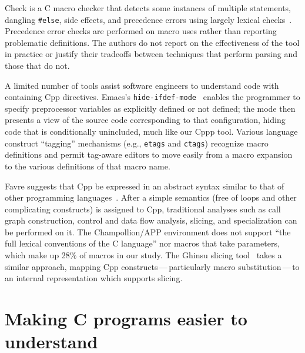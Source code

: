 \documentclass[10pt]{article}
\begin{document}

Check is a C macro checker that detects some instances of multiple
statements, dangling {\tt \#else}, side effects, and precedence errors
using largely lexical checks~\cite{SpulerS92}.  Precedence error checks are
performed on macro uses rather than reporting problematic definitions.  The
authors do not report on the effectiveness of the tool in practice or
justify their tradeoffs between techniques that perform parsing and those
that do not.

A limited number of tools assist software engineers to
understand code with containing Cpp directives.  Emacs's
\texttt{hide-ifdef-mode}~\cite{GNUEmacs19.26} enables the programmer to specify
preprocessor variables as explicitly defined or not defined; the mode then
presents a view of the source code corresponding to that configuration,
hiding code that is conditionally unincluded, much like our Cppp tool.
Various language construct ``tagging'' mechanisms (e.g., \texttt{etags} and
\texttt{ctags}) recognize macro definitions and permit tag-aware editors
to move easily from a macro expansion to the various definitions of that
macro name.

Favre suggests that Cpp be expressed in an abstract syntax similar to that of
other programming languages~\cite{Favre96}.  After a simple semantics (free
of loops and other complicating constructs) is assigned to Cpp, traditional
analyses such as call graph construction, control and data flow analysis,
slicing, and specialization can be performed on it.  The Champollion/APP
environment does not support ``the full lexical conventions of the C
language'' nor macros that take parameters, which make up 28\% of macros in
our study.
The Ghinsu slicing tool~\cite{LivadasS94} takes a similar approach, mapping
Cpp constructs\,---\,particularly macro substitution\,---\,to an internal
representation which supports slicing.




\section{Making C programs easier to understand}
\label{sec:easier-to-understand}
\end{document}
